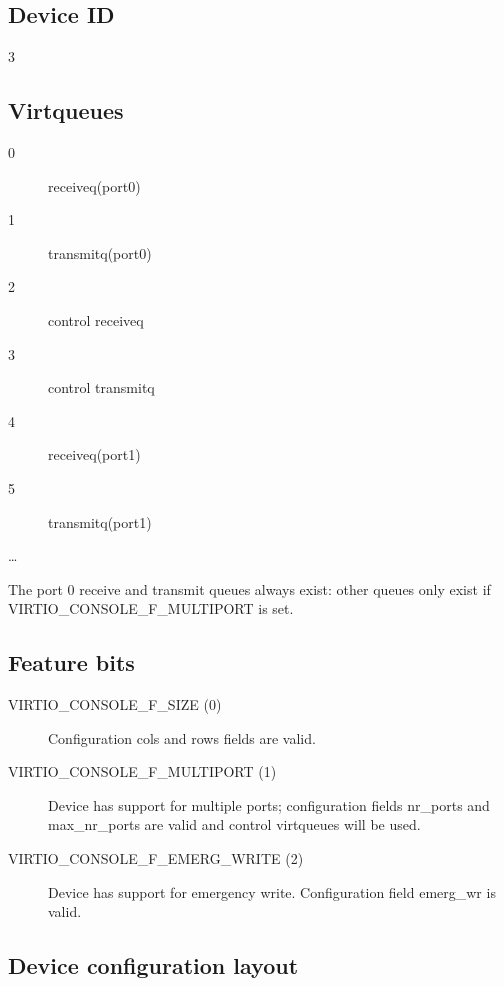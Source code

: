 \subsection{Device ID}\label{sec:Device Types / Console Device / Device ID}

  3

\subsection{Virtqueues}\label{sec:Device Types / Console Device / Virtqueues}

\begin{description}
\item[0] receiveq(port0)
\item[1] transmitq(port0)
\item[2] control receiveq
\item[3] control transmitq
\item[4] receiveq(port1)
\item[5] transmitq(port1)
\item[\ldots]
\end{description}

The port 0 receive and transmit queues always exist: other queues
only exist if VIRTIO_CONSOLE_F_MULTIPORT is set.

\subsection{Feature bits}\label{sec:Device Types / Console Device / Feature bits}

\begin{description}
\item[VIRTIO_CONSOLE_F_SIZE (0)] Configuration cols and rows fields
    are valid.

\item[VIRTIO_CONSOLE_F_MULTIPORT (1)] Device has support for multiple
    ports; configuration fields nr_ports and max_nr_ports are
    valid and control virtqueues will be used.

\item[VIRTIO_CONSOLE_F_EMERG_WRITE (2)] Device has support for emergency write.
    Configuration field emerg_wr is valid.
\end{description}

\subsection{Device configuration layout}\label{sec:Device Types / Console Device / Device configuration layout}

